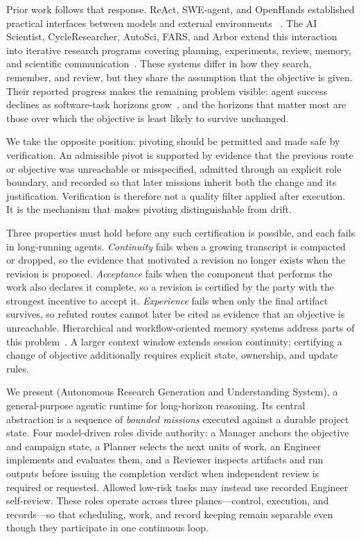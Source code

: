 Prior work follows that response. ReAct, SWE-agent, and OpenHands established
practical interfaces between models and external environments
~\citep{yao2023react,yang2024sweagent,wang2024openhands}. The AI Scientist,
CycleResearcher, AutoSci, FARS, and Arbor extend this interaction into iterative
research programs covering planning, experiments, review, memory, and scientific
communication~\citep{lu2024aiscientist,weng2025cycleresearcher,qian2026autosci,
tang2026fars,jin2026arbor}. These systems differ in how they search, remember, and
review, but they share the assumption that the objective is given. Their reported
progress makes the remaining problem visible: agent success declines as software-task
horizons grow~\citep{kwa2025longtasks}, and the horizons that matter most are those
over which the objective is least likely to survive unchanged.

We take the opposite position: pivoting should be permitted and made safe by
verification. An admissible pivot is supported by evidence that the previous route
or objective was unreachable or misspecified, admitted through an explicit role
boundary, and recorded so that later missions inherit both the change and its
justification. Verification is therefore not a quality filter applied after
execution. It is the mechanism that makes pivoting distinguishable from drift.

Three properties must hold before any such certification is possible, and each fails
in long-running agents. \emph{Continuity} fails when a growing transcript is compacted
or dropped, so the evidence that motivated a revision no longer exists when the
revision is proposed. \emph{Acceptance} fails when the component that performs the
work also declares it complete, so a revision is certified by the party with the
strongest incentive to accept it. \emph{Experience} fails when only the final artifact
survives, so refuted routes cannot later be cited as evidence that an objective is
unreachable. Hierarchical and workflow-oriented memory systems address parts of this
problem~\citep{packer2023memgpt,wang2024workflowmemory,xu2025amem}. A larger context
window extends session continuity; certifying a change of objective additionally
requires explicit state, ownership, and update rules.

We present \systemname (Autonomous Research Generation and Understanding System), a
general-purpose agentic runtime for long-horizon reasoning. Its central abstraction
is a sequence of \emph{bounded missions} executed against a durable project state.
Four model-driven roles divide authority: a Manager anchors the objective and
campaign state, a Planner selects the next units of work, an Engineer implements
and evaluates them, and a Reviewer inspects artifacts and run outputs before issuing
the completion verdict when independent review is required or requested. Allowed
low-risk tasks may instead use recorded Engineer self-review. These roles operate across three planes---control,
execution, and records---so that scheduling, work, and record keeping remain
separable even though they participate in one continuous loop.

